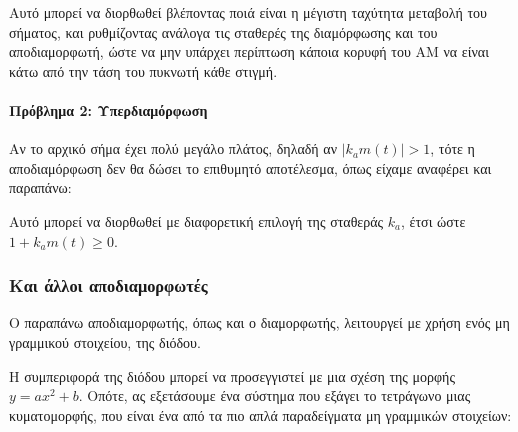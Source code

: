 \documentclass[11pt,a4paper,notitlepage,fleqn]{article}
\begin{document}
Αυτό μπορεί να διορθωθεί βλέποντας ποιά είναι η μέγιστη ταχύτητα μεταβολή του σήματος, και
ρυθμίζοντας ανάλογα τις σταθερές της διαμόρφωσης και του αποδιαμορφωτή, ώστε να μην υπάρχει
περίπτωση κάποια κορυφή του AM να είναι κάτω από την τάση του πυκνωτή κάθε στιγμή.

\paragraph{Πρόβλημα 2: Υπερδιαμόρφωση}

Αν το αρχικό σήμα έχει πολύ μεγάλο πλάτος, δηλαδή
αν \( \left| k_a m(t) \right| > 1 \), τότε η αποδιαμόρφωση δεν θα δώσει το επιθυμητό
αποτέλεσμα, όπως είχαμε αναφέρει και παραπάνω:


Αυτό μπορεί να διορθωθεί με διαφορετική επιλογή της σταθεράς \( k_a \), έτσι ώστε \( 1 + k_am(t) \geq 0 \).

\subsubsection{Και άλλοι αποδιαμορφωτές}
Ο παραπάνω αποδιαμορφωτής, όπως και ο διαμορφωτής, λειτουργεί με χρήση ενός μη γραμμικού
στοιχείου, της διόδου.


Η συμπεριφορά της διόδου μπορεί να προσεγγιστεί με μια σχέση της μορφής \( y= ax^2+b \).
Οπότε, ας εξετάσουμε ένα σύστημα που εξάγει το τετράγωνο μιας κυματομορφής, που είναι ένα
από τα πιο απλά παραδείγματα μη γραμμικών στοιχείων:
\end{document}
